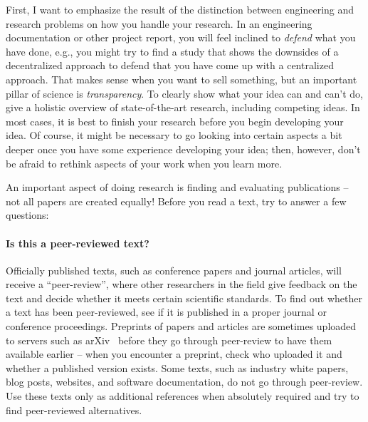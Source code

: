 \documentclass[a4]{article}
\begin{document}
First, I want to emphasize the result of the distinction between engineering and research problems on how you handle your research.
In an engineering documentation or other project report, you will feel inclined to \emph{defend} what you have done, e.g., you might try to find a study that shows the downsides of a decentralized approach to defend that you have come up with a centralized approach.
That makes sense when you want to sell something, but an important pillar of science is \emph{transparency}.
To clearly show what your idea can and can't do, give a holistic overview of state-of-the-art research, including competing ideas.
In most cases, it is best to finish your research before you begin developing your idea.
Of course, it might be necessary to go looking into certain aspects a bit deeper once you have some experience developing your idea; then, however, don't be afraid to rethink aspects of your work when you learn more.

An important aspect of doing research is finding and evaluating publications -- not all papers are created equally!
Before you read a text, try to answer a few questions:

\paragraph{Is this a peer-reviewed text?}
Officially published texts, such as conference papers and journal articles, will receive a ``peer-review'', where other researchers in the field give feedback on the text and decide whether it meets certain scientific standards.
To find out whether a text has been peer-reviewed, see if it is published in a proper journal or conference proceedings.
Preprints of papers and articles are sometimes uploaded to servers such as arXiv~\cite{arxiv} before they go through peer-review to have them available earlier -- when you encounter a preprint, check who uploaded it and whether a published version exists.
Some texts, such as industry white papers, blog posts, websites, and software documentation, do not go through peer-review.
Use these texts only as additional references when absolutely required and try to find peer-reviewed alternatives.
\end{document}
